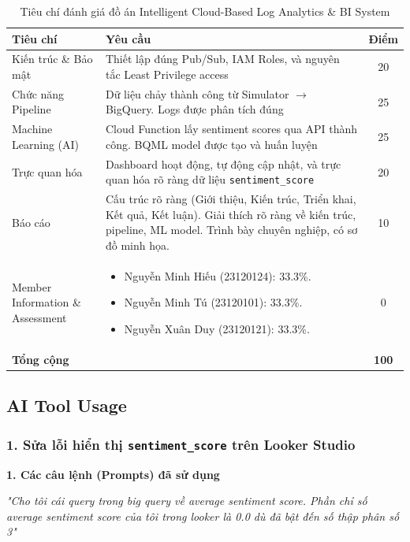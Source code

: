 \begin{table}[H]
\centering
\begin{tabular}{|p{2.8cm}|p{7.2cm}|c|}
\hline
\textbf{Tiêu chí} & \textbf{Yêu cầu} & \textbf{Điểm} \\
\hline
Kiến trúc \& Bảo mật & Thiết lập đúng Pub/Sub, IAM Roles, và nguyên tắc Least Privilege access & 20 \\
\hline
Chức năng Pipeline & Dữ liệu chảy thành công từ Simulator $\to$ BigQuery. Logs được phân tích đúng & 25 \\
\hline
Machine Learning (AI) & Cloud Function lấy sentiment scores qua API thành công. BQML model được tạo và huấn luyện & 25 \\
\hline
Trực quan hóa & Dashboard hoạt động, tự động cập nhật, và trực quan hóa rõ ràng dữ liệu \texttt{sentiment\_score} & 20 \\
\hline
Báo cáo & Cấu trúc rõ ràng (Giới thiệu, Kiến trúc, Triển khai, Kết quả, Kết luận). Giải thích rõ ràng về kiến trúc, pipeline, ML model. Trình bày chuyên nghiệp, có sơ đồ minh họa. & 10 \\
\hline
Member Information \& Assessment & 
\begin{itemize}
    \item Nguyễn Minh Hiếu (23120124): 33.3\%.
    \item Nguyễn Minh Tú (23120101): 33.3\%.
    \item Nguyễn Xuân Duy (23120121): 33.3\%.
\end{itemize} & 0 \\
\hline
\textbf{Tổng cộng} & & \textbf{100} \\
\hline
\end{tabular}
\caption{Tiêu chí đánh giá đồ án Intelligent Cloud-Based Log Analytics \& BI System}
\end{table}

\clearpage

\subsection{AI Tool Usage}

\subsubsection{1. Sửa lỗi hiển thị \texttt{sentiment\_score} trên Looker Studio}

\textbf{1. Các câu lệnh (Prompts) đã sử dụng}

\textit{"Cho tôi cái query trong big query về average sentiment score. Phần chỉ số average sentiment score của tôi trong looker là 0.0 dù đã bật đến số thập phân số 3"}

